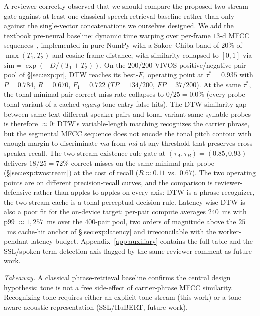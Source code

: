 \documentclass[a4paper,fleqn]{cas-dc}
\begin{document}
A reviewer correctly observed that we should compare the proposed two-stream gate against at least one classical speech-retrieval baseline rather than only against the single-vector concatenations we ourselves designed. We add the textbook pre-neural baseline: dynamic time warping over per-frame $13$-d MFCC sequences~\citep{sakoe1978dtw}, implemented in pure NumPy with a Sakoe--Chiba band of $20\%$ of $\max(T_{1}, T_{2})$ and cosine frame distance, with similarity collapsed to $[0, 1]$ via $\mathrm{sim} = \exp(-D/(T_{1}+T_{2}))$. On the $200/200$ VIVOS positive/negative pair pool of \S\ref{sec:exp:pr}, DTW reaches its best-$F_{1}$ operating point at $\tau^{*} = 0.935$ with $P = 0.784$, $R = 0.670$, $F_{1} = 0.722$ ($TP = 134/200$, $FP = 37/200$). At the same $\tau^{*}$, the tonal-minimal-pair correct-miss rate collapses to $0/25 = 0.0\%$ (every probe tonal variant of a cached \emph{ngang}-tone entry false-hits). The DTW similarity gap between same-text-different-speaker pairs and tonal-variant-same-syllable probes is therefore $\approx 0$: DTW's variable-length matching recognizes the carrier phrase, but the segmental MFCC sequence does not encode the tonal pitch contour with enough margin to discriminate \emph{ma} from \emph{m\'a} at any threshold that preserves cross-speaker recall. The two-stream existence-rule gate at $(\tau_{A}, \tau_{B}) = (0.85, 0.93)$ delivers $18/25 = 72\%$ correct misses on the same minimal-pair probe (\S\ref{sec:exp:twostream}) at the cost of recall ($R \approx 0.11$ vs.\ $0.67$). The two operating points are on different precision-recall curves, and the comparison is reviewer-defensive rather than apples-to-apples on every axis: DTW is a phrase recognizer, the two-stream cache is a tonal-perceptual decision rule. Latency-wise DTW is also a poor fit for the on-device target: per-pair compute averages $240$~ms with p99 $\approx 1{,}257$~ms over the $400$-pair pool, two orders of magnitude above the $25$~ms cache-hit anchor of \S\ref{sec:exp:latency} and irreconcilable with the worker-pendant latency budget. Appendix~\ref{app:auxiliary} contains the full table and the SSL/spoken-term-detection axis flagged by the same reviewer comment as future work.

\noindent\textit{Takeaway.} A classical phrase-retrieval baseline confirms the central design hypothesis: tone is not a free side-effect of carrier-phrase MFCC similarity. Recognizing tone requires either an explicit tone stream (this work) or a tone-aware acoustic representation (SSL/HuBERT, future work).
\end{document}
